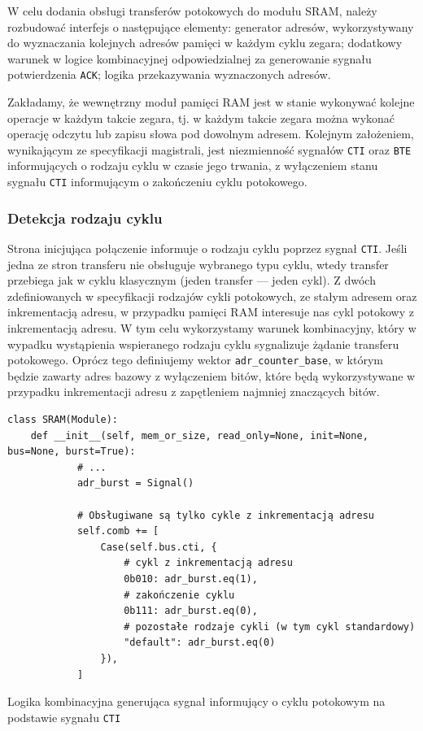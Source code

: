 W celu dodania obsługi transferów potokowych do modułu SRAM, należy rozbudować interfejs o następujące elementy: generator adresów, wykorzystywany do wyznaczania kolejnych adresów pamięci w każdym cyklu zegara; dodatkowy warunek w logice kombinacyjnej odpowiedzialnej za generowanie sygnału potwierdzenia \texttt{ACK}; logika przekazywania wyznaczonych adresów.

Zakładamy, że wewnętrzny moduł pamięci RAM jest w stanie wykonywać kolejne operacje w każdym takcie zegara, tj. w każdym takcie zegara można wykonać operację odczytu lub zapisu słowa pod dowolnym adresem.
Kolejnym założeniem, wynikającym ze specyfikacji magistrali, jest niezmienność sygnałów \texttt{CTI} oraz \texttt{BTE} informujących o rodzaju cyklu w czasie jego trwania, z wyłączeniem stanu sygnału \texttt{CTI} informującym o zakończeniu cyklu potokowego.

\subsubsection{Detekcja rodzaju cyklu}

Strona inicjująca połączenie informuje o rodzaju cyklu poprzez sygnał \texttt{CTI}. Jeśli jedna ze stron transferu nie obsługuje wybranego typu cyklu, wtedy transfer przebiega jak w cyklu klasycznym (jeden transfer --- jeden cykl).
Z dwóch zdefiniowanych w specyfikacji rodzajów cykli potokowych, ze stałym adresem oraz inkrementacją adresu, w przypadku pamięci RAM interesuje nas cykl potokowy z inkrementacją adresu. W tym celu wykorzystamy warunek kombinacyjny, który w wypadku wystąpienia wspieranego rodzaju cyklu sygnalizuje żądanie transferu potokowego.
Oprócz tego definiujemy wektor \texttt{adr_counter_base}, w którym będzie zawarty adres bazowy z wyłączeniem bitów, które będą wykorzystywane w przypadku inkrementacji adresu z zapętleniem najmniej znaczących bitów.

\begin{longlisting}
\begin{verbatim}
class SRAM(Module):
    def __init__(self, mem_or_size, read_only=None, init=None, bus=None, burst=True):
            # ...
            adr_burst = Signal()

            # Obsługiwane są tylko cykle z inkrementacją adresu
            self.comb += [
                Case(self.bus.cti, {
                    # cykl z inkrementacją adresu
                    0b010: adr_burst.eq(1),
                    # zakończenie cyklu
                    0b111: adr_burst.eq(0),
                    # pozostałe rodzaje cykli (w tym cykl standardowy)
                    "default": adr_burst.eq(0)
                }),
            ]
\end{verbatim}
\caption{Logika kombinacyjna generująca sygnał informujący o cyklu potokowym na podstawie sygnału \texttt{CTI}}
\label{lst:impl-sram-detect}
\end{longlisting}

